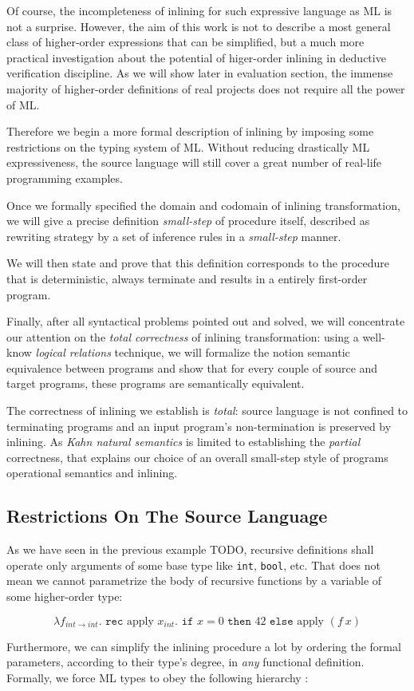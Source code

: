 \documentclass[a4paper,11pt,oneside]{article}
\theoremstyle{plain}
\begin{document}
Of course, the incompleteness of inlining for such expressive language as ML is not a surprise. However, the aim of this work is not to describe a most general class of higher-order expressions that can be simplified, but a much more practical investigation about the potential of higer-order inlining in deductive verification discipline. As we will show later in evaluation section, the immense majority of higher-order definitions of real projects does not require all the power of ML. 

Therefore we begin a more formal description of inlining by imposing some restrictions on the typing system of ML. Without reducing drastically ML expressiveness, the source language will still cover a great number of real-life programming examples. 

Once we formally specified the domain and codomain of inlining transformation, we will give a precise definition  \textit{small-step} of procedure itself, described as rewriting strategy by a set of inference rules in a \textit{small-step} manner. 

We will then state and prove that this definition corresponds to the procedure that is deterministic, always terminate and results in a entirely first-order program. 

Finally, after all syntactical problems pointed out and solved, we will concentrate our attention on the \textit{total correctness} of inlining transformation: using a well-know \textit{logical relations} technique, we will formalize the notion semantic equivalence between programs and show that for every couple of source and target programs, these programs are semantically equivalent. 
 
The correctness of inlining we establish is \textit{total}: source language is not confined to terminating programs and an input program's non-termination is preserved by inlining. As \textit{Kahn natural semantics} is limited to establishing the \textit{partial} correctness, that explains our choice of an overall small-step style of programs operational semantics and inlining. 


\subsection{Restrictions On The Source Language}

As we have seen in the previous example TODO, recursive definitions shall operate only arguments of some base type like \texttt{int}, \texttt{bool}, etc. That does not mean we cannot parametrize the body of recursive functions by a variable of some higher-order type:
\begin{footnotesize}
$$ \lambda f_{int \rightarrow int}. \texttt{ rec } \text{apply } x_{int} . 
\texttt{ if } x = 0 \texttt{ then } 42 \texttt{ else} \text{ apply } (f~x)$$
\end{footnotesize}
Furthermore, we can simplify the inlining procedure a lot by ordering the formal parameters, according to their type's degree, in \textit{any} functional definition.  Formally, we force ML types to obey the following hierarchy :
\end{document}
